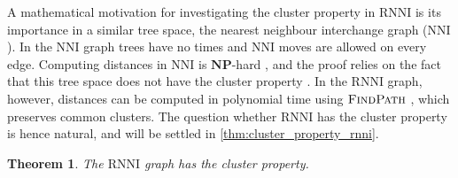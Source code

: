 \documentclass[11pt]{amsart}
\newtheorem{theorem}{Theorem}
\newcommand{\rnni}{\mathrm{RNNI}}
\newcommand{\findpath}{\textsc{FindPath}}
\newcommand{\nni}{\mathrm{NNI}}
\newcommand{\np}{\mathbf{NP}}
\newcommand{\summary}[1]{} %
\begin{document}
\summary{Cluster property in $\nni$ and its connection to the complexity result.}
A mathematical motivation for investigating the cluster property in $\rnni$ is its importance in a similar tree space, the nearest neighbour interchange graph ($\nni$).
In the $\nni$ graph trees have no times and $\nni$ moves are allowed on every edge.
Computing distances in $\nni$ is $\np$-hard \autocite{Dasgupta2000-xa}, and the proof relies on the fact that this tree space does not have the cluster property \autocite{Li1996-zw}.
In the $\rnni$ graph, however, distances can be computed in polynomial time using $\findpath$ \autocite{Collienne2020-iu}, which preserves common clusters.
The question whether $\rnni$ has the cluster property is hence natural, and will be settled in \autoref{thm:cluster_property_rnni}.

\summary{$\rnni$ has the cluster property.}
\begin{theorem}
	The $\rnni$ graph has the cluster property.
	\label{thm:cluster_property_rnni}
\end{theorem}
\end{document}
